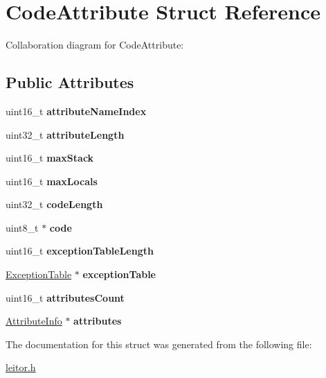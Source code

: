 \hypertarget{structCodeAttribute}{}\section{Code\+Attribute Struct Reference}
\label{structCodeAttribute}


Collaboration diagram for Code\+Attribute\+:
\subsection*{Public Attributes}
\begin{DoxyCompactItemize}
\item 
\mbox{\label{structCodeAttribute_ad7ee24e03606191ad3f75e919e10d314}} 
uint16\+\_\+t {\bfseries attribute\+Name\+Index}
\item 
\mbox{\label{structCodeAttribute_ad7847fdf04ce98313bf197308db2f3eb}} 
uint32\+\_\+t {\bfseries attribute\+Length}
\item 
\mbox{\label{structCodeAttribute_a909f0678f0621617233e76073a55976a}} 
uint16\+\_\+t {\bfseries max\+Stack}
\item 
\mbox{\label{structCodeAttribute_a8fe52af0bc8aa61d0dbeb8a3a9233731}} 
uint16\+\_\+t {\bfseries max\+Locals}
\item 
\mbox{\label{structCodeAttribute_a56ef08dd29653bdfd922f59dbf3ca619}} 
uint32\+\_\+t {\bfseries code\+Length}
\item 
\mbox{\label{structCodeAttribute_a95d8e9c3e0b93220defcbc9852ec6c27}} 
uint8\+\_\+t $\ast$ {\bfseries code}
\item 
\mbox{\label{structCodeAttribute_adcab31464c6fcea300f5fd171c536591}} 
uint16\+\_\+t {\bfseries exception\+Table\+Length}
\item 
\mbox{\label{structCodeAttribute_a59ef2cc9a1890d0fd0436278ef14c87a}} 
\hyperlink{structExceptionTable}{Exception\+Table} $\ast$ {\bfseries exception\+Table}
\item 
\mbox{\label{structCodeAttribute_ae76ef93751db55059ac434e073178f83}} 
uint16\+\_\+t {\bfseries attributes\+Count}
\item 
\mbox{\label{structCodeAttribute_a99297a4945c876dd5615d84986043c21}} 
\hyperlink{structAttributeInfo}{Attribute\+Info} $\ast$ {\bfseries attributes}
\end{DoxyCompactItemize}


The documentation for this struct was generated from the following file\+:\begin{DoxyCompactItemize}
\item 
\hyperlink{leitor_8h}{leitor.\+h}\end{DoxyCompactItemize}

